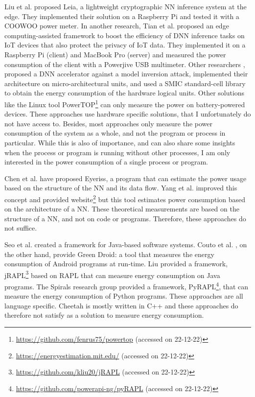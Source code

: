 \documentclass[../thesis.tex]{subfiles}
\begin{document}
Liu et al. \parencite*{liu2022} proposed Leia, a lightweight cryptographic NN inference system at the edge. They implemented their solution on a Raspberry Pi and tested it with a COOWOO power meter. In another research, Tian et al. \parencite*{tian2021} proposed an edge computing-assisted framework to boost the efficiency of DNN inference tasks on IoT devices that also protect the privacy of IoT data. They implemented it on a Raspberry Pi (client) and MacBook Pro (server) and measured the power consumption of the client with a Powerjive USB multimeter. Other researchers \parencite{wang2019}, proposed a DNN accelerator against a model inversion attack, implemented their architecture on micro-architectural units, and used a SMIC standard-cell library to obtain the energy consumption of the hardware logical units. Other solutions like the Linux tool PowerTOP\footnote{\url{https://github.com/fenrus75/powertop} (accessed on 22-12-22)} can only measure the power on battery-powered devices. These approaches use hardware specific solutions, that I unfortunately do not have access to. Besides, most approaches only measure the power consumption of the system as a whole, and not the program or process in particular. While this is also of importance, and can also share some insights when the process or program is running without other processes, I am only interested in the power consumption of a single process or program.

Chen et al. \parencite*{chen2016, chen20162} have proposed Eyeriss, a program that can estimate the power usage based on the structure of the NN and its data flow. Yang et al. \parencite*{yang2016} improved this concept and provided website\footnote{\url{https://energyestimation.mit.edu/} (accessed on 22-12-22)} but this tool estimates power consumption based on the architecture of a NN. These theoretical measurements are based on the structure of a NN, and not on code or programs. Therefore, these approaches do not suffice.

Seo et al. \parencite*{seo2008} created a framework for Java-based software systems. Couto et al. \parencite*{couto2015}, on the other hand, provide Green Droid: a tool that measures the energy consumption of Android programs at run-time. Liu provided a framework, jRAPL\footnote{\url{https://github.com/kliu20/jRAPL} (accessed on 22-12-22)} based on RAPL that can measure energy consumption on Java programs. The Spirals research group provided a framework, PyRAPL\footnote{\url{https://github.com/powerapi-ng/pyRAPL} (accessed on 22-12-22)}, that can measure the energy consumption of Python programs. These approaches are all language specific. Cheetah is mostly written in C++ and these approaches do therefore not satisfy as a solution to measure energy consumption.
\end{document}
